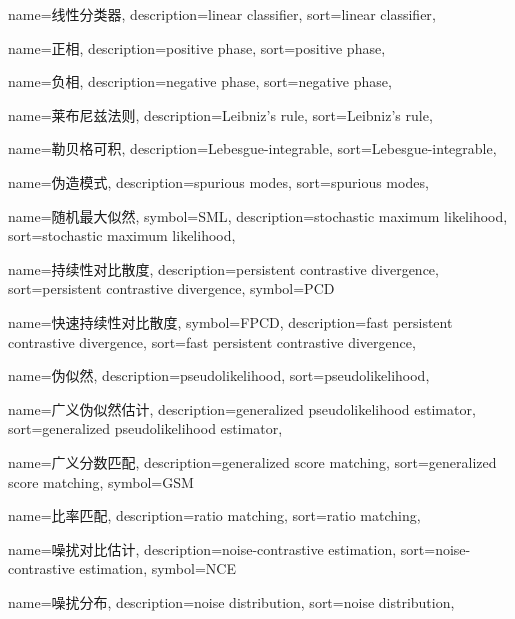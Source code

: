 {
  name=线性分类器,
  description={linear classifier},
  sort={linear classifier},
}

{
  name=正相,
  description={positive phase},
  sort={positive phase},
}

{
  name=负相,
  description={negative phase},
  sort={negative phase},
}

{
  name=莱布尼兹法则,
  description={Leibniz's rule},
  sort={Leibniz's rule},
}

{
  name=勒贝格可积,
  description={Lebesgue-integrable},
  sort={Lebesgue-integrable},
}

{
  name=伪造模式,
  description={spurious modes},
  sort={spurious modes},
}

{
  name=随机最大似然,
  symbol={SML},
  description={stochastic maximum likelihood},
  sort={stochastic maximum likelihood},
}

{
  name=持续性对比散度,
  description={persistent contrastive divergence},
  sort={persistent contrastive divergence},
  symbol={PCD}
}

{
  name=快速持续性对比散度,
  symbol={FPCD},
  description={fast persistent contrastive divergence},
  sort={fast persistent contrastive divergence},
}

{
  name=伪似然,
  description={pseudolikelihood},
  sort={pseudolikelihood},
}

{
  name=广义伪似然估计,
  description={generalized pseudolikelihood estimator},
  sort={generalized pseudolikelihood estimator},
}

{
  name=广义分数匹配,
  description={generalized score matching},
  sort={generalized score matching},
  symbol={GSM}
}

{
  name=比率匹配,
  description={ratio matching},
  sort={ratio matching},
}

{
  name=噪扰对比估计,
  description={noise-contrastive estimation},
  sort={noise-contrastive estimation},
  symbol={NCE}
}

{
  name=噪扰分布,
  description={noise distribution},
  sort={noise distribution},
}

